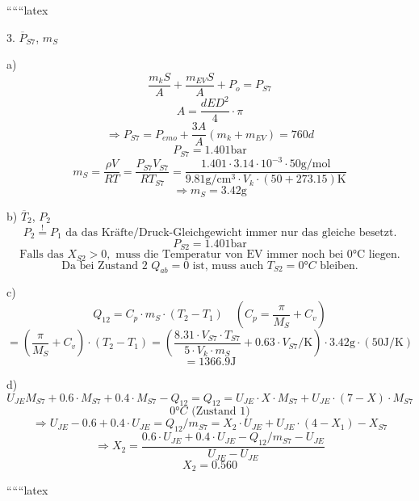 
``````latex


3. $\overline{P}_{S7}$, $m_S$

a)
\[
\frac{m_k S}{A} + \frac{m_{E V} S}{A} + P_o = P_{S7}
\]
\[
A = \frac{dE D^2}{4} \cdot \pi
\]
\[
\Rightarrow P_{S7} = P_{emo} + \frac{3A}{A} (m_k + m_{EV}) = 760 d
\]
\[
P_{S7} = 1.401 \text{bar}
\]
\[
m_S = \frac{\rho V}{R T} = \frac{P_{S7} V_{S7}}{R T_{S7}} = \frac{1.401 \cdot 3.14 \cdot 10^{-3} \cdot 50 \text{g/mol}}{9.81 \text{g} / \text{cm}^3 \cdot V_k \cdot (50 + 273.15) \text{K}}
\]
\[
\Rightarrow m_S = 3.42 \text{g}
\]

b) $\overline{T}_2$, $P_2$
\[
P_2 \overset{!}{=} P_1 \text{ da das Kräfte/Druck-Gleichgewicht immer nur das gleiche besetzt.}
\]
\[
P_{S2} = 1.401 \text{bar}
\]
\[
\text{Falls das } X_{S2} > 0, \text{ muss die Temperatur von EV immer noch bei 0°C liegen.}
\]
\[
\text{Da bei Zustand 2 } Q_{ab} = 0 \text{ ist, muss auch } T_{S2} = 0°C \text{ bleiben.}
\]

c)
\[
Q_{12} = C_p \cdot m_S \cdot (T_2 - T_1) \quad \left( C_p = \frac{\pi}{M_S} + C_v \right)
\]
\[
= \left( \frac{\pi}{M_S} + C_v \right) \cdot (T_2 - T_1) = \left( \frac{8.31 \cdot V_{S7} \cdot T_{S7}}{5 \cdot V_k \cdot m_S} + 0.63 \cdot V_{S7} / \text{K} \right) \cdot 3.42 \text{g} \cdot (50 \text{J} / \text{K})
\]
\[
= 1366.9 \text{J}
\]

d)
\[
U_{JE} M_{S7} + 0.6 \cdot M_{S7} + 0.4 \cdot M_{S7} - Q_{12} = Q_{12} = U_{JE} \cdot X \cdot M_{S7} + U_{JE} \cdot (7 - X) \cdot M_{S7}
\]
\[
0°C \text{ (Zustand 1)}
\]
\[
\Rightarrow U_{JE} - 0.6 + 0.4 \cdot U_{JE} = Q_{12} / m_{S7} = X_2 \cdot U_{JE} + U_{JE} \cdot (4 - X_1) - X_{S7}
\]
\[
\Rightarrow X_2 = \frac{0.6 \cdot U_{JE} + 0.4 \cdot U_{JE} - Q_{12} / m_{S7} - U_{JE}}{U_{JE} - U_{JE}}
\]
\[
X_2 = 0.560
\]

``````latex



